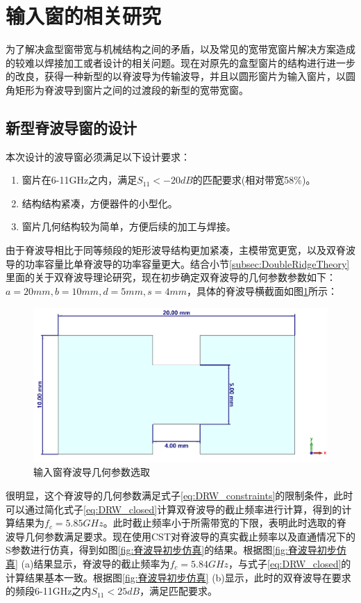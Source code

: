 \documentclass[master]{thesis-uestc}
\begin{document}
\section{输入窗的相关研究}
为了解决盒型窗带宽与机械结构之间的矛盾，以及常见的宽带宽窗片解决方案造成的较难以焊接加工或者设计的相关问题。现在对原先的盒型窗片的结构进行进一步的改良，获得一种新型的以脊波导为传输波导，并且以圆形窗片为输入窗片，以圆角矩形为脊波导到窗片之间的过渡段的新型的宽带宽窗。
\subsection{新型脊波导窗的设计}
本次设计的波导窗必须满足以下设计要求：
\begin{enumerate}
    \item 窗片在6-11GHz之内，满足$S_{11}<-20dB$的匹配要求(相对带宽58\%)。
    \item 结构结构紧凑，方便器件的小型化。
    \item 窗片几何结构较为简单，方便后续的加工与焊接。
\end{enumerate}

由于脊波导相比于同等频段的矩形波导结构更加紧凑，主模带宽更宽，以及双脊波导的功率容量比单脊波导的功率容量更大。结合小节\ref{subsec:DoubleRidgeTheory}里面的关于双脊波导理论研究，现在初步确定双脊波导的几何参数参数如下：$a=20mm, b=10mm, d=5mm, s=4mm $，具体的脊波导横截面如图\ref{fig:6-11GHzDRW}所示：
\begin{figure}[!htb]
    \includegraphics[width=0.7\linewidth]{pic/chapter3/6-11GHzDRW.png}
    \caption[short catption 1]{输入窗脊波导几何参数选取}
    \label{fig:6-11GHzDRW}
\end{figure}

很明显，这个脊波导的几何参数满足式子\ref{eq:DRW_constraints}的限制条件，此时可以通过简化式子\ref{eq:DRW_closed}计算双脊波导的截止频率进行计算，得到的计算结果为$f_c=5.85GHz$。此时截止频率小于所需带宽的下限，表明此时选取的脊波导几何参数满足要求。现在使用CST对脊波导的真实截止频率以及直通情况下的S参数进行仿真，得到如图\ref{fig:脊波导初步仿真}的结果。根据图\ref{fig:脊波导初步仿真} (a)结果显示，脊波导的截止频率为$f_c=5.84GHz$，与式子\ref{eq:DRW_closed}的计算结果基本一致。根据图\ref{fig:脊波导初步仿真} (b)显示，此时的双脊波导在要求的频段6-11GHz之内$S_{11}<25dB$，满足匹配要求。
\end{document}
